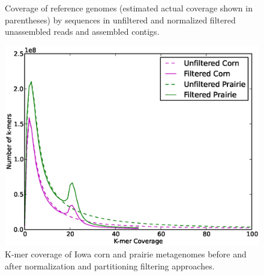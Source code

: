 \documentclass{pnastwo}
\begin{document}
\begin{figure}
\caption{Coverage of reference genomes (estimated actual coverage shown in parentheses) by sequences in unfiltered and normalized filtered unassembled reads and assembled contigs.}
\label{coverage1}
\end{figure}

\begin{figure}
\begin{center}
\centerline{\includegraphics[width=.7\textwidth]{./figures/fig2-diginormhist.eps}}
\caption{K-mer coverage of Iowa corn and prairie metagenomes before
  and after normalization and partitioning filtering approaches.}
\label{diginormcoverage}
\end{center}
\end{figure}
\end{document}
